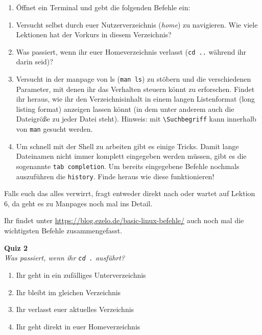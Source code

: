 \begin{praxis}
	\begin{enumerate}
		\item Öffnet ein Terminal und gebt die folgenden Befehle ein:
	\end{enumerate}
\end{praxis}

\begin{spiel}
	\begin{enumerate}
		\item Versucht selbst durch euer Nutzerverzeichnis (\emph{home}) zu navigieren.
		      Wie viele Lektionen hat der Vorkurs in diesem Verzeichnis?
		\item Was passiert, wenn ihr euer Homeverzeichnis verlasst (\texttt{cd ..}
		      während ihr darin seid)?
		\item Versucht in der manpage von ls (\texttt{man ls}) zu stöbern und die
		      verschiedenen Parameter, mit denen ihr das Verhalten steuern könnt zu
		      erforschen. Findet ihr heraus, wie ihr den Verzeichnisinhalt in einem
		      langen Listenformat (long listing format) anzeigen lassen könnt (in dem
		      unter anderem auch die Dateigröße zu jeder Datei steht).
		      Hinweis: mit \texttt{\textbackslash Suchbegriff} kann innerhalb von \texttt{man} gesucht werden.
		\item Um schnell mit der Shell zu arbeiten gibt es einige Tricks.
		      Damit lange Dateinamen nicht immer komplett eingegeben werden müssen, gibt es die sogenannte \texttt{tab completion}.
		      Um bereits eingegebene Befehle nochmals auszuführen die \texttt{history}. Finde heraus wie diese funktionieren!
	\end{enumerate}
\end{spiel}


Falls euch das alles verwirrt, fragt entweder direkt nach oder wartet auf
Lektion 6, da geht es zu Manpages noch mal ins Detail.

Ihr findet unter \url{https://blog.ezelo.de/basic-linux-befehle/} auch noch mal
die wichtigsten Befehle zusammengefasst.

\textbf{Quiz 2}\\
\textit{Was passiert, wenn ihr \texttt{cd .} ausführt?}
\begin{enumerate}[label=\alph*)]
	\item Ihr geht in ein zufälliges Unterverzeichnis
	\item Ihr bleibt im gleichen Verzeichnis
	\item Ihr verlasst euer aktuelles Verzeichnis
	\item Ihr geht direkt in euer Homeverzeichnis
\end{enumerate}

